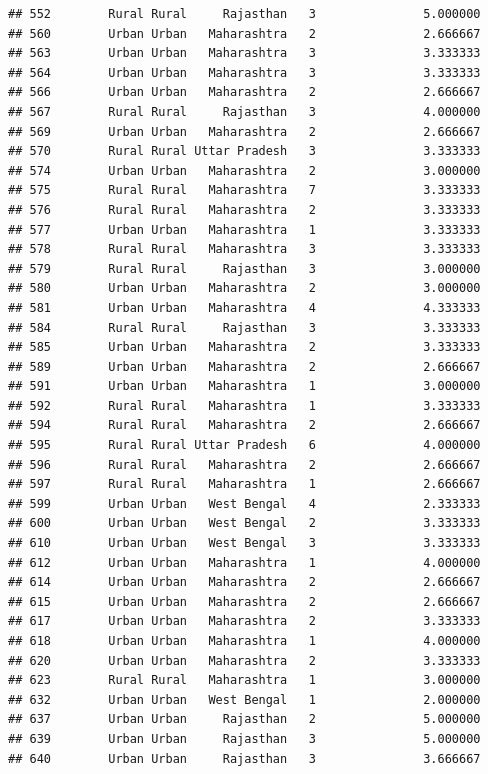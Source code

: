 \documentclass[
]{article}
\begin{document}
\begin{verbatim}
## 552        Rural Rural     Rajasthan   3               5.000000
## 560        Urban Urban   Maharashtra   2               2.666667
## 563        Urban Urban   Maharashtra   3               3.333333
## 564        Urban Urban   Maharashtra   3               3.333333
## 566        Urban Urban   Maharashtra   2               2.666667
## 567        Rural Rural     Rajasthan   3               4.000000
## 569        Urban Urban   Maharashtra   2               2.666667
## 570        Rural Rural Uttar Pradesh   3               3.333333
## 574        Urban Urban   Maharashtra   2               3.000000
## 575        Rural Rural   Maharashtra   7               3.333333
## 576        Rural Rural   Maharashtra   2               3.333333
## 577        Urban Urban   Maharashtra   1               3.333333
## 578        Rural Rural   Maharashtra   3               3.333333
## 579        Rural Rural     Rajasthan   3               3.000000
## 580        Urban Urban   Maharashtra   2               3.000000
## 581        Urban Urban   Maharashtra   4               4.333333
## 584        Rural Rural     Rajasthan   3               3.333333
## 585        Urban Urban   Maharashtra   2               3.333333
## 589        Urban Urban   Maharashtra   2               2.666667
## 591        Urban Urban   Maharashtra   1               3.000000
## 592        Rural Rural   Maharashtra   1               3.333333
## 594        Rural Rural   Maharashtra   2               2.666667
## 595        Rural Rural Uttar Pradesh   6               4.000000
## 596        Rural Rural   Maharashtra   2               2.666667
## 597        Rural Rural   Maharashtra   1               2.666667
## 599        Urban Urban   West Bengal   4               2.333333
## 600        Urban Urban   West Bengal   2               3.333333
## 610        Urban Urban   West Bengal   3               3.333333
## 612        Urban Urban   Maharashtra   1               4.000000
## 614        Urban Urban   Maharashtra   2               2.666667
## 615        Urban Urban   Maharashtra   2               2.666667
## 617        Urban Urban   Maharashtra   2               3.333333
## 618        Urban Urban   Maharashtra   1               4.000000
## 620        Urban Urban   Maharashtra   2               3.333333
## 623        Rural Rural   Maharashtra   1               3.000000
## 632        Urban Urban   West Bengal   1               2.000000
## 637        Urban Urban     Rajasthan   2               5.000000
## 639        Urban Urban     Rajasthan   3               5.000000
## 640        Urban Urban     Rajasthan   3               3.666667

\end{verbatim}
\end{document}
